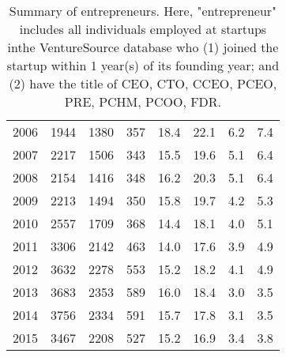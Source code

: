 \begin{table}[!htb]
\begin{tabular}{p{1.75cm}p{1.75cm}p{1.75cm}p{1.75cm}p{1.75cm}p{1.75cm}p{1.75cm}p{1.75cm}}
  2006 & 1944 & 1380 & 357 & 18.4 & 22.1 & 6.2 & 7.4 \\ 
  2007 & 2217 & 1506 & 343 & 15.5 & 19.6 & 5.1 & 6.4 \\ 
  2008 & 2154 & 1416 & 348 & 16.2 & 20.3 & 5.1 & 6.4 \\ 
  2009 & 2213 & 1494 & 350 & 15.8 & 19.7 & 4.2 & 5.3 \\ 
  2010 & 2557 & 1709 & 368 & 14.4 & 18.1 & 4.0 & 5.1 \\ 
  2011 & 3306 & 2142 & 463 & 14.0 & 17.6 & 3.9 & 4.9 \\ 
  2012 & 3632 & 2278 & 553 & 15.2 & 18.2 & 4.1 & 4.9 \\ 
  2013 & 3683 & 2353 & 589 & 16.0 & 18.4 & 3.0 & 3.5 \\ 
  2014 & 3756 & 2334 & 591 & 15.7 & 17.8 & 3.1 & 3.5 \\ 
  2015 & 3467 & 2208 & 527 & 15.2 & 16.9 & 3.4 & 3.8 \\ 
   \bottomrule
\end{tabular}
\endgroup
\caption{Summary of entrepreneurs. Here, "entrepreneur" includes all individuals employed at startups inthe VentureSource database who (1) joined the startup within 1 year(s) of its founding year; and (2) have the title of CEO, CTO, CCEO, PCEO, PRE, PCHM, PCOO, FDR.} 
\end{table}
